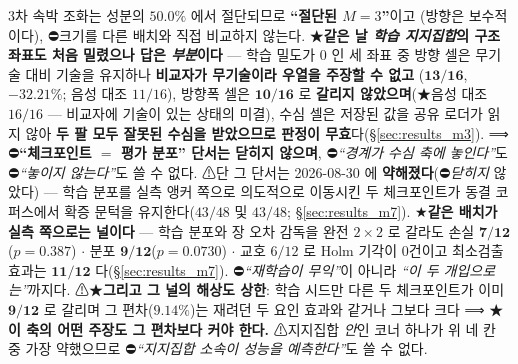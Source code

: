 \documentclass[11pt]{report}
\numberwithin{equation}{chapter}
\numberwithin{figure}{chapter}
\numberwithin{table}{chapter}
\begin{document}
\begin{itemize}
        $3$차 속박 조화는 성분의 $50.0\%$ 에서 절단되므로 \textbf{``절단된 $M{=}3$''}이고
        (방향은 보수적이다), ⛔크기를 다른 배치와 직접 비교하지 않는다.
        ★\textbf{같은 날 \emph{학습 지지집합}의 구조 좌표도 처음 밀렸으나 답은
        \emph{부분}이다} --- 학습 밀도가 $0$ 인 세 좌표 중 방향 셀은 무기술 대비
        기술을 유지하나 \textbf{비교자가 무기술이라 우열을 주장할 수 없고}
        ($\mathbf{13/16}$, $-32.21\%$; 음성 대조 $11/16$), 방향폭 셀은
        $\mathbf{10/16}$ 로 \textbf{갈리지 않았으며}(★음성 대조 $16/16$ --- 비교자에
        기술이 있는 상태의 미결), 수심 셀은 저장된 값을 공유 로더가 읽지 않아 \textbf{두
        팔 모두 잘못된 수심을 받았으므로 판정이 무효}다(\S\ref{sec:results_m3}).
        ⟹ ⛔\textbf{``체크포인트 $=$ 평가 분포'' 단서는 닫히지 않으며},
        ⛔\emph{``경계가 수심 축에 놓인다''}도 ⛔\emph{``놓이지 않는다''}도 쓸 수 없다.
        ⚠단 그 단서는 2026-08-30 에 \textbf{약해졌다}(⛔\emph{닫히지} 않았다) --- 학습 분포를
        실측 앵커 쪽으로 의도적으로 이동시킨 두 체크포인트가 동결 코퍼스에서 확증 문턱을
        유지한다($43/48$ 및 $43/48$; \S\ref{sec:results_m7}).
        ★\textbf{같은 배치가 실측 쪽으로는 널이다} --- 학습 분포와 장 오차 감독을 완전
        $2\times2$ 로 갈라도 손실 $\mathbf{7/12}$($p = 0.387$) $\cdot$ 분포
        $\mathbf{9/12}$($p = \mathbf{0.0730}$) $\cdot$ 교호 $6/12$ 로 Holm 기각이
        $0$건이고 최소검출효과는 $\mathbf{11/12}$ 다(\S\ref{sec:results_m7}).
        ⛔\emph{``재학습이 무익''}이 아니라 \emph{``이 두 개입으로는''}까지다.
        ⚠★\textbf{그리고 그 널의 해상도 상한}: 학습 시드만 다른 두 체크포인트가 이미
        $\mathbf{9/12}$ 로 갈리며 그 편차($\mathbf{9.14\%}$)는 재려던 두 요인 효과와
        같거나 그보다 크다 ⟹ ★\textbf{이 축의 어떤 주장도 그 편차보다 커야 한다.}
        ⚠지지집합 \emph{안}인 코너 하나가 위 네 칸 중 가장 약했으므로
        ⛔\emph{``지지집합 소속이 성능을 예측한다''}도 쓸 수 없다.

\end{itemize}
\end{document}
